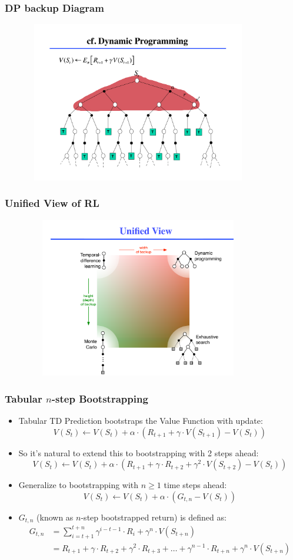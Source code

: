 \documentclass[handout]{beamer}
\begin{document}
\begin{frame}
\frametitle{DP backup Diagram}
\includegraphics[width=12cm, height=7cm]{dp_backup.png}
\end{frame}

\begin{frame}
\frametitle{Unified View of RL}
\includegraphics[width=12cm, height=7cm]{unified_view.png}
\end{frame}





\begin{frame}
\frametitle{Tabular $n$-step Bootstrapping}
\pause
\begin{itemize}[<+->]
\item Tabular TD Prediction bootstraps the Value Function with update:
$$V(S_t) \leftarrow V(S_t) + \alpha \cdot (R_{t+1} + \gamma \cdot V(S_{t+1}) - V(S_t))$$
\item So it's natural to extend this to bootstrapping with 2 steps ahead:
$$V(S_t) \leftarrow V(S_t) + \alpha \cdot (R_{t+1} + \gamma \cdot R_{t+2} + \gamma^2 \cdot V(S_{t+2})- V(S_t))$$
\item Generalize to bootstrapping with $n \geq 1$ time steps ahead:
$$V(S_t) \leftarrow V(S_t) + \alpha \cdot (G_{t,n} - V(S_t))$$
\item $G_{t,n}$ (known as $n$-step bootstrapped return) is defined as:
\begin{align*}
G_{t,n} & = \sum_{i=t+1}^{t+n} \gamma^{i-t-1} \cdot R_i  + \gamma^n \cdot V(S_{t+n}) \\
& = R_{t+1} + \gamma \cdot R_{t+2} + \gamma^2 \cdot R_{t+3} + \ldots + \gamma^{n-1} \cdot R_{t+n} + \gamma^n \cdot V(S_{t+n})
\end{align*}
\end{itemize}
\end{frame}
\end{document}
